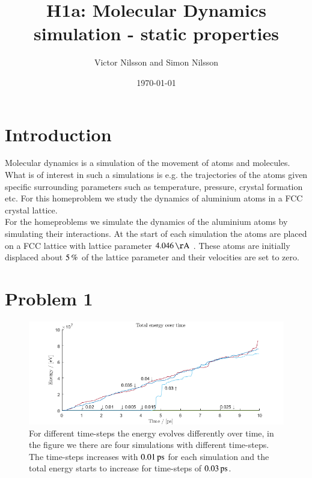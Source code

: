 



\title{H1a: Molecular Dynamics simulation - static properties}
\author{Victor Nilsson and Simon Nilsson}
\date{\today}





\section*{Introduction}

Molecular dynamics is a simulation of the movement of atoms and molecules. What is of interest in such a simulations is e.g. the trajectories of the atoms given specific surrounding parameters such as temperature, pressure, crystal formation etc. For this homeproblem we study the dynamics of aluminium atoms in a FCC crystal lattice.\\

For the homeproblems we simulate the dynamics of the aluminium atoms by simulating their interactions. At the start of each simulation the atoms are placed on a FCC lattice with lattice parameter $\unit[4.046]{Å}$ \cite{al_wiki}. These atoms are initially displaced about $\unit[5]{\%}$ of the lattice parameter and their velocities are set to zero.

\section*{Problem 1}

\begin{figure}[H]
    \centering
    \includegraphics[width=\textwidth]{graphics/task1/energy.png}
    \caption{For different time-steps the energy evolves differently over time, in the figure we there are four simulations with different time-steps. The time-steps increases with $\unit[0.01]{ps}$ for each simulation and the total energy starts to increase for time-steps of $\unit[0.03]{ps}$.}
    \label{fig:timestep}
\end{figure}

